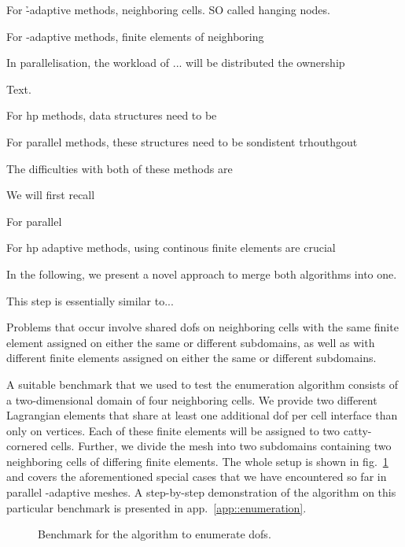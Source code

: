For \h-adaptive methods, neighboring cells. SO called hanging nodes.

For \p-adaptive methods, finite elements of neighboring 

In parallelisation, the workload of ... will be distributed the ownership




Text.


For hp methods, data structures need to be 

For parallel methods, these structures need to be sondistent trhouthgout

The difficulties with both of these methods are

We will first recall

For parallel


For hp adaptive methods, using continous finite elements are crucial

In the following, we present a novel approach to merge both algorithms into one.



This step is essentially similar to...


Problems that occur involve shared \glspl{dof} on neighboring cells with the same finite element assigned on either the same or different subdomains, as well as with different finite elements assigned on either the same or different subdomains.

A suitable benchmark that we used to test the enumeration algorithm consists of a two-dimensional domain of four neighboring cells. We provide two different Lagrangian elements that share at least one additional \gls{dof} per cell interface than only on vertices. Each of these finite elements will be assigned to two catty-cornered cells. Further, we divide the mesh into two subdomains containing two neighboring cells of differing finite elements. The whole setup is shown in fig.~\ref{fig:enumbenchmark} and covers the aforementioned special cases that we have encountered so far in parallel \hp-adaptive meshes. A step-by-step demonstration of the algorithm on this particular benchmark is presented in app.~\ref{app::enumeration}.

\begin{figure}
  \centering
  \caption{Benchmark for the algorithm to enumerate \glspl{dof}.}
  \label{fig:enumbenchmark}
\end{figure}

